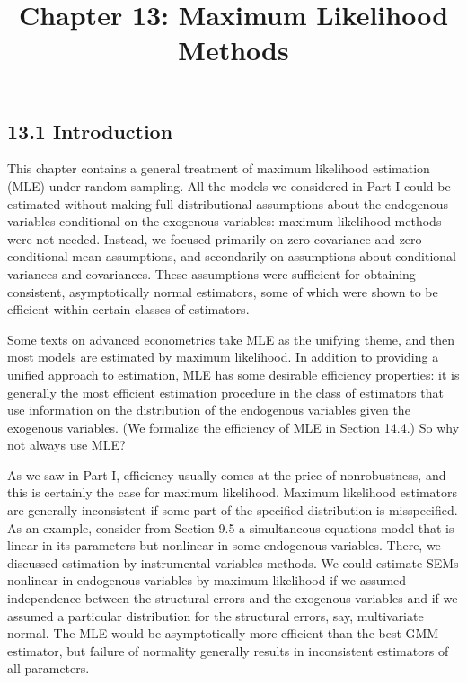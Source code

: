 \documentclass[10pt]{article}
\title{Chapter 13: Maximum Likelihood Methods}
\author{}
\date{}
\begin{document}
\maketitle

\subsection*{13.1 Introduction}
This chapter contains a general treatment of maximum likelihood estimation (MLE) under random sampling. All the models we considered in Part I could be estimated without making full distributional assumptions about the endogenous variables conditional on the exogenous variables: maximum likelihood methods were not needed. Instead, we focused primarily on zero-covariance and zero-conditional-mean assumptions, and secondarily on assumptions about conditional variances and covariances. These assumptions were sufficient for obtaining consistent, asymptotically normal estimators, some of which were shown to be efficient within certain classes of estimators.

Some texts on advanced econometrics take MLE as the unifying theme, and then most models are estimated by maximum likelihood. In addition to providing a unified approach to estimation, MLE has some desirable efficiency properties: it is generally the most efficient estimation procedure in the class of estimators that use information on the distribution of the endogenous variables given the exogenous variables. (We formalize the efficiency of MLE in Section 14.4.) So why not always use MLE?

As we saw in Part I, efficiency usually comes at the price of nonrobustness, and this is certainly the case for maximum likelihood. Maximum likelihood estimators are generally inconsistent if some part of the specified distribution is misspecified. As an example, consider from Section 9.5 a simultaneous equations model that is linear in its parameters but nonlinear in some endogenous variables. There, we discussed estimation by instrumental variables methods. We could estimate SEMs nonlinear in endogenous variables by maximum likelihood if we assumed independence between the structural errors and the exogenous variables and if we assumed a particular distribution for the structural errors, say, multivariate normal. The MLE would be asymptotically more efficient than the best GMM estimator, but failure of normality generally results in inconsistent estimators of all parameters.
\end{document}
